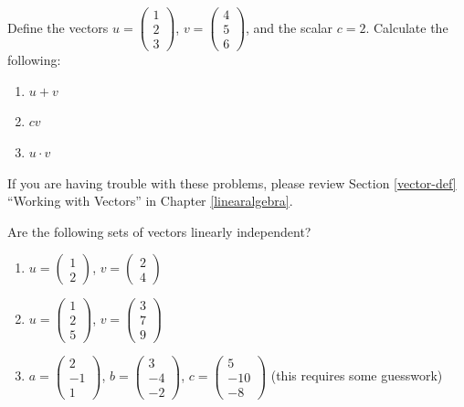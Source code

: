 \documentclass[]{book}
\providecommand{\tightlist}{%
  \setlength{\itemsep}{0pt}\setlength{\parskip}{0pt}}
\theoremstyle{definition}
\theoremstyle{definition}
\theoremstyle{definition}
\theoremstyle{remark}
\begin{document}
Define the vectors \(u = \begin{pmatrix} 1 \\2 \\3 \end{pmatrix}\), \(v = \begin{pmatrix} 4\\5\\6 \end{pmatrix}\), and the scalar \(c = 2\). Calculate the following:

\begin{enumerate}
\def\labelenumi{\arabic{enumi}.}
\tightlist
\item
  \(u + v\)
\item
  \(cv\)
\item
  \(u \cdot v\)
\end{enumerate}

If you are having trouble with these problems, please review Section \ref{vector-def} ``Working with Vectors'' in Chapter \ref{linearalgebra}.

Are the following sets of vectors linearly independent?

\begin{enumerate}
\def\labelenumi{\arabic{enumi}.}
\item
  \(u = \begin{pmatrix} 1\\ 2\end{pmatrix}\), \(v = \begin{pmatrix} 2\\4\end{pmatrix}\)
\item
  \(u = \begin{pmatrix} 1\\ 2\\ 5 \end{pmatrix}\), \(v = \begin{pmatrix} 3\\ 7\\ 9 \end{pmatrix}\)
\item
  \(a = \begin{pmatrix} 2\\ -1\\ 1 \end{pmatrix}\), \(b = \begin{pmatrix} 3\\ -4\\ -2 \end{pmatrix}\), \(c = \begin{pmatrix} 5\\ -10\\ -8 \end{pmatrix}\) (this requires some guesswork)
\end{enumerate}
\end{document}
